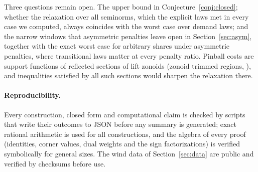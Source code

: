 \documentclass[11pt,a4paper]{article}
\theoremstyle{remark}
\begin{document}
Three questions remain open. The upper bound in Conjecture~\ref{conj:closed};
whether the relaxation over all seminorms, which the explicit laws met in every
case we computed, always coincides with the worst case over demand laws; and
the narrow windows that asymmetric penalties leave open in
Section~\ref{sec:asym}, together with the exact worst case for arbitrary
shares under asymmetric penalties, where transitional laws matter at every
penalty ratio. Pinball costs are support functions of reflected sections of
lift zonoids (zonoid trimmed regions, \citealp{koshevoy1997zonoid}), and
inequalities satisfied by all such sections would sharpen the relaxation
there.

\paragraph{Reproducibility.} Every construction, closed form and computational
claim is checked by scripts that write their outcomes to JSON before any summary
is generated; exact rational arithmetic is used for all constructions, and the
algebra of every proof (identities, corner values, dual weights and the sign
factorizations) is verified symbolically for general sizes. The wind data of
Section~\ref{sec:data} are public and verified by checksums before use.



\end{document}
